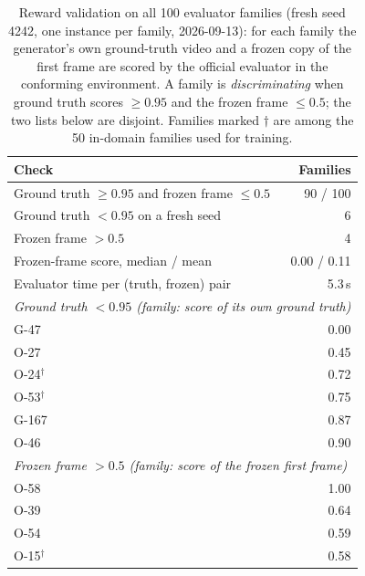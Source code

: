 \begin{table}[H]
\centering
\small
\setlength{\tabcolsep}{5pt}
\caption{Reward validation on all 100 evaluator families (fresh seed 4242, one instance per family, 2026-09-13): for each family the generator's own ground-truth video and a frozen copy of the first frame are scored by the official evaluator in the conforming environment. A family is \emph{discriminating} when ground truth scores $\geq 0.95$ and the frozen frame $\leq 0.5$; the two lists below are disjoint. Families marked $\dagger$ are among the 50 in-domain families used for training.}
\label{tab:rewardcheck}
\begin{tabular}{lr}
\toprule
Check & Families \\
\midrule
Ground truth $\geq 0.95$ and frozen frame $\leq 0.5$ & 90 / 100 \\
Ground truth $< 0.95$ on a fresh seed & 6 \\
Frozen frame $> 0.5$ & 4 \\
Frozen-frame score, median / mean & 0.00 / 0.11 \\
Evaluator time per (truth, frozen) pair & 5.3\,s \\
\midrule
\multicolumn{2}{l}{\textit{Ground truth $< 0.95$ (family: score of its own ground truth)}} \\
\quad G-47 & 0.00 \\
\quad O-27 & 0.45 \\
\quad O-24$^\dagger$ & 0.72 \\
\quad O-53$^\dagger$ & 0.75 \\
\quad G-167 & 0.87 \\
\quad O-46 & 0.90 \\
\midrule
\multicolumn{2}{l}{\textit{Frozen frame $> 0.5$ (family: score of the frozen first frame)}} \\
\quad O-58 & 1.00 \\
\quad O-39 & 0.64 \\
\quad O-54 & 0.59 \\
\quad O-15$^\dagger$ & 0.58 \\
\bottomrule
\end{tabular}
\end{table}
